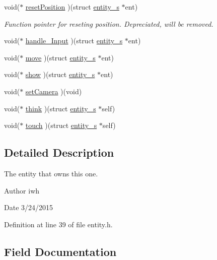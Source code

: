 \begin{DoxyCompactItemize}
\item 
void($\ast$ \hyperlink{structentity__s_a92ed3b86c791f2114d9a1147443e7fe5}{reset\+Position} )(struct \hyperlink{structentity__s}{entity\+\_\+s} $\ast$ent)
\begin{DoxyCompactList}\small\item\em Function pointer for reseting position. Depreciated, will be removed. \end{DoxyCompactList}\item 
void($\ast$ \hyperlink{structentity__s_a132b9a4937472ef21d9f098eeae36336}{handle\+\_\+\+Input} )(struct \hyperlink{structentity__s}{entity\+\_\+s} $\ast$ent)
\item 
void($\ast$ \hyperlink{structentity__s_ac02404c3a0246eb63f2a8363f453c2e5}{move} )(struct \hyperlink{structentity__s}{entity\+\_\+s} $\ast$ent)
\item 
void($\ast$ \hyperlink{structentity__s_a0d1a05278f29fdd42ce786f2baf02f06}{show} )(struct \hyperlink{structentity__s}{entity\+\_\+s} $\ast$ent)
\item 
void($\ast$ \hyperlink{structentity__s_af4dbc59d08fcac46ed1ea8abadef6cb4}{set\+Camera} )(void)
\item 
void($\ast$ \hyperlink{structentity__s_ab0cc49e009785df670b0991ef6c7c47e}{think} )(struct \hyperlink{structentity__s}{entity\+\_\+s} $\ast$self)
\item 
void($\ast$ \hyperlink{structentity__s_aa818c2577d3f6bcf8cf087c1b2c27227}{touch} )(struct \hyperlink{structentity__s}{entity\+\_\+s} $\ast$self)
\end{DoxyCompactItemize}


\subsection{Detailed Description}
The entity that owns this one. 

\begin{DoxyAuthor}{Author}
iwh 
\end{DoxyAuthor}
\begin{DoxyDate}{Date}
3/24/2015 
\end{DoxyDate}


Definition at line 39 of file entity.\+h.



\subsection{Field Documentation}
\hypertarget{structentity__s_a1243efedb746d6c3b56bea6b10d3c851}{}
